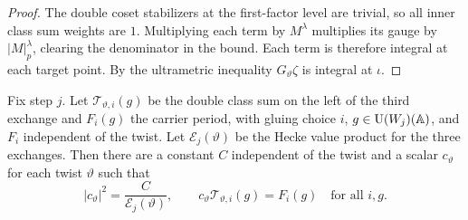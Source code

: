 \begin{proof}
The double coset stabilizers at the first-factor level are trivial, so all inner class sum weights are $1$. Multiplying each term by $M^\lambda$ multiplies its gauge by $|M|_p^\lambda$, clearing the denominator in the bound. Each term is therefore integral at each target point. By the ultrametric inequality $G_\vartheta\zeta$ is integral at $\iota$.
\end{proof}

\begin{lemma}
\label{lem:c-third-exchange}
\emitthmsource
Fix step $j$. Let $\mathcal T_{\vartheta,i}(g)$ be the double class sum on the left of the third exchange and $F_i(g)$ the carrier period, with gluing choice $i$, $g\in \operatorname{U}(W_j)(\mathbb A)$, and $F_i$ independent of the twist. Let $\mathcal E_j(\vartheta)$ be the Hecke value product for the three exchanges. Then there are a constant $C$ independent of the twist and a scalar $c_\vartheta$ for each twist $\vartheta$ such that
\[
 |c_\vartheta|^2=\frac{C}{\mathcal E_j(\vartheta)},
 \qquad
 c_\vartheta\mathcal T_{\vartheta,i}(g)=F_i(g)
 \quad\text{for all }i,g .
\]
\end{lemma}

